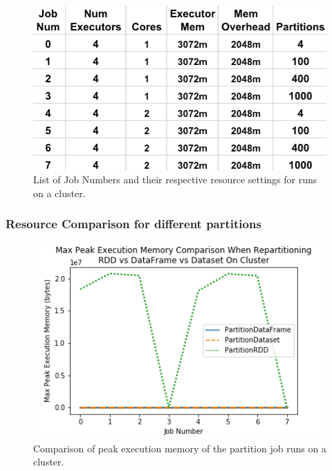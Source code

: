 \documentclass[conference]{IEEEtran}
\begin{document}
\begin{figure}
    \includegraphics[width=\linewidth]{images/partition_cluster_job.png}
    \caption{List of Job Numbers and their respective resource settings for runs on a cluster.}
    \label{fig:cluster_local_job}
\end{figure}

\subsubsection{Resource Comparison for different partitions}
\begin{figure}
    \includegraphics[width=\linewidth]{../python_scripts/images/partitionJobsMaxPeakExecutionMemoryCluster.png}
    \caption{Comparison of peak execution memory of the partition job runs on a cluster.}
    \label{fig:partitionJobsMaxPeakExecutionMemoryCluster}
\end{figure}
\end{document}

